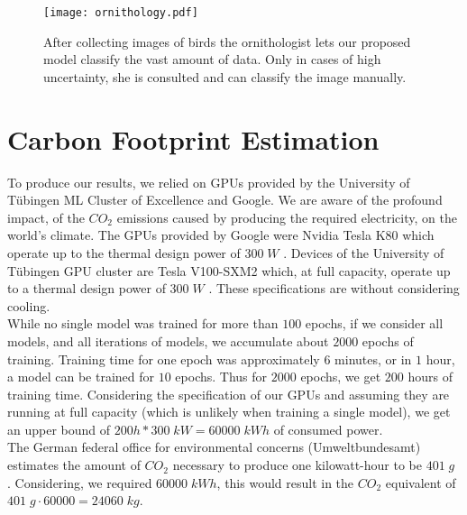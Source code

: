 \documentclass[a4paper,cleardoubleempty,BCOR1cm, 11pt]{report}
\begin{document}
\begin{figure}[h]
	\centering
	\texttt{[image: ornithology.pdf]}
	\caption{After collecting images of birds the ornithologist lets our proposed model classify the vast amount of data. Only in cases of high uncertainty, she is consulted and can classify the image manually.}
	\label{fig:qual}
\end{figure}

\section{Carbon Footprint Estimation}
To produce our results, we relied on GPUs provided by the University of Tübingen ML Cluster of Excellence and Google. We are aware of the profound impact, of the $CO_2$ emissions caused by producing the required electricity, on the world's climate.
The GPUs provided by Google were Nvidia Tesla K80 which operate up to the thermal design power of $300\;W$ \cite{nvidia2015tesla}. Devices of the University of Tübingen GPU cluster are Tesla V100-SXM2 which, at full capacity, operate up to a thermal design power of $300\;W$ \cite{nvidia2017tesla}. These specifications are without considering cooling.\\
While no single model was trained for more than $100$ epochs, if we consider all models, and all iterations of models, we accumulate about $2000$ epochs of training. Training time for one epoch was approximately $6$ minutes, or in $1$ hour, a model can be trained for $10$ epochs. Thus for $2000$ epochs, we get $200$ hours of training time. Considering the specification of our GPUs and assuming they are running at full capacity (which is unlikely when training a single model), we get an upper bound of $200h * 300\;kW = 60000\;kWh$ of consumed power.\\
The German federal office for environmental concerns (Umweltbundesamt) estimates the amount of $CO_2$ necessary to produce one kilowatt-hour to be $401\;g$ \cite{icha2016entwicklung}. Considering, we required $60000\;kWh$, this would result in the $CO_2$ equivalent of $401\;g \cdot 60000 = 24060\;kg$.
\end{document}
